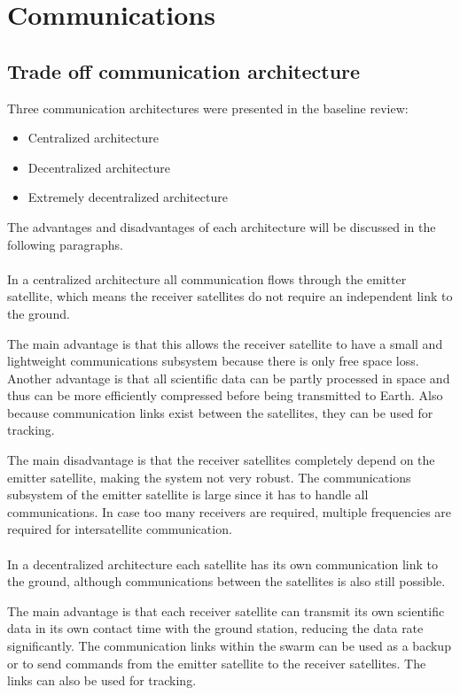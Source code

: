 \section{Communications}
\label{mtrTOCOM}

\subsection{Trade off communication architecture}
Three communication architectures were presented in the baseline review:
\begin{itemize}
\item Centralized architecture
\item Decentralized architecture
\item Extremely decentralized architecture
\end{itemize}

The advantages and disadvantages of each architecture will be discussed in the following paragraphs.\\\\
In a centralized architecture all communication flows through the emitter satellite, which means the receiver satellites do not require an independent link to the ground.

The main advantage is that this allows the receiver satellite to have a small and lightweight communications subsystem because there is only free space loss. Another advantage is that all scientific data can be partly processed in space and thus can be more efficiently compressed before being transmitted to Earth. Also because communication links exist between the satellites, they can be used for tracking.

The main disadvantage is that the receiver satellites completely depend on the emitter satellite, making the system not very robust. The communications subsystem of the emitter satellite is large since it has to handle all communications. In case too many receivers are required, multiple frequencies are required for intersatellite communication.\\\\

In a decentralized architecture each satellite has its own communication link to the ground, although communications between the satellites is also still possible.

The main advantage is that each receiver satellite can transmit its own scientific data in its own contact time with the ground station, reducing the data rate significantly. The communication links within the swarm can be used as a backup or to send commands from the emitter satellite to the receiver satellites. The links can also be used for tracking.

